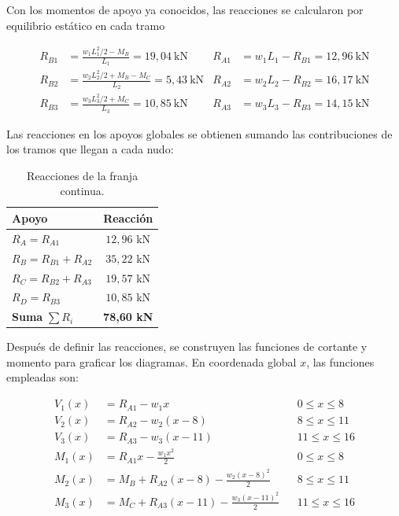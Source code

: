 ﻿\documentclass[12pt,letterpaper]{article}
\begin{document}
Con los momentos de apoyo ya conocidos, las reacciones se calcularon por equilibrio estático en cada tramo

\begin{align*}
R_{B1} &= \frac{w_1L_1^2/2 - M_B}{L_1} = 19{,}04 \ \text{kN}
&
R_{A1} &= w_1L_1 - R_{B1} = 12{,}96 \ \text{kN} \\
R_{B2} &= \frac{w_2L_2^2/2 + M_B - M_C}{L_2} = 5{,}43 \ \text{kN}
&
R_{A2} &= w_2L_2 - R_{B2} = 16{,}17 \ \text{kN} \\
R_{B3} &= \frac{w_3L_3^2/2 + M_C}{L_3} = 10{,}85 \ \text{kN}
&
R_{A3} &= w_3L_3 - R_{B3} = 14{,}15 \ \text{kN}
\end{align*}

Las reacciones en los apoyos globales se obtienen sumando las contribuciones de los tramos que llegan a cada nudo:

\begin{table}[H]
    \centering
    \begin{tabular}{>{\raggedright\arraybackslash}p{6cm} c}
        \toprule
        Apoyo & Reacción \\
        \midrule
        $R_A=R_{A1}$ & $12{,}96$ kN \\
        $R_B=R_{B1}+R_{A2}$ & $35{,}22$ kN \\
        $R_C=R_{B2}+R_{A3}$ & $19{,}57$ kN \\
        $R_D=R_{B3}$ & $10{,}85$ kN \\
        \midrule
        \textbf{Suma} $\sum R_i$ & \textbf{78{,}60 kN} \\
        \bottomrule
    \end{tabular}
    \caption{Reacciones de la franja continua.}
    \label{tab:reacciones-nervio}
\end{table}

Después de definir las reacciones, se construyen las funciones de cortante y momento para graficar los diagramas. En coordenada global $x$, las funciones empleadas son:

\begin{align*}
V_1(x) &= R_{A1}-w_1x && 0 \leq x \leq 8 \\
V_2(x) &= R_{A2}-w_2(x-8) && 8 \leq x \leq 11 \\
V_3(x) &= R_{A3}-w_3(x-11) && 11 \leq x \leq 16 \\
M_1(x) &= R_{A1}x-\frac{w_1x^2}{2} && 0 \leq x \leq 8 \\
M_2(x) &= M_B+R_{A2}(x-8)-\frac{w_2(x-8)^2}{2} && 8 \leq x \leq 11 \\
M_3(x) &= M_C+R_{A3}(x-11)-\frac{w_3(x-11)^2}{2} && 11 \leq x \leq 16
\end{align*}
\end{document}
